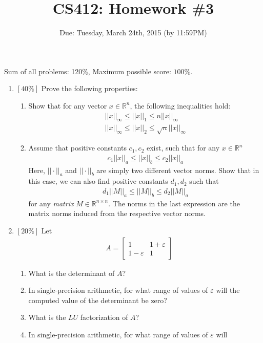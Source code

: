 \documentclass{article}
\author{}
\title{CS412: Homework \#3}
\author{Due: Tuesday, March 24th, 2015 (by 11:59PM)}
\date{}
\begin{document}
\maketitle

\noindent Sum of all problems: 120$\%$, Maximum possible score: $100\%$.
\vspace{.2in}

\begin{enumerate}
\item $[40\%]$ Prove the following properties:
\begin{enumerate}
\item
Show that for any vector $x\in\mathbb R^n$, the following inequalities hold:
\begin{eqnarray*}
||x||_\infty\leq ||x||_1\leq n||x||_\infty \\
||x||_\infty\leq ||x||_2\leq \sqrt{n}||x||_\infty
\end{eqnarray*}
\item
Assume that positive constants $c_1,c_2$ exist, such that for any $x\in\mathbb
R^n$
\begin{eqnarray*}
c_1||x||_a\leq ||x||_b\leq c_2||x||_a
\end{eqnarray*}
Here, $||\cdot||_a$ and $||\cdot||_b$ are simply two different vector norms.
Show that in this case, we can also find positive constants $d_1,d_2$ such that
\begin{eqnarray*}
d_1||M||_a\leq ||M||_b\leq d_2||M||_a
\end{eqnarray*}
for any \emph{matrix} $M\in\mathbb R^{n\times n}$. The norms in the last
expression are the matrix norms induced from the respective vector norms.
\end{enumerate}
\item
$[20\%]$ Let
\begin{eqnarray*}
A=\left[
\begin{array}{cc}
1 & 1+\varepsilon \\
1-\varepsilon & 1
\end{array}
\right]
\end{eqnarray*}
\begin{enumerate}
\item
What is the determinant of $A$?
\item
In single-precision arithmetic, for what range of values of $\varepsilon$ will
the computed value of the determinant be zero?
\item
What is the $LU$ factorization of $A$?
\item
In single-precision arithmetic, for what range of values of $\varepsilon$ will

\end{enumerate}
\end{enumerate}
\end{document}
